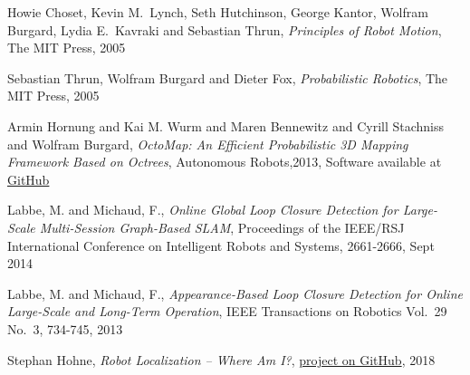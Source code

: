 \documentclass[10pt, journal, compsoc]{IEEEtran}
\begin{document}

\begin{thebibliography}{6}

Howie Choset, Kevin M.\ Lynch, Seth Hutchinson, George Kantor, Wolfram Burgard, Lydia E.\ Kavraki and Sebastian Thrun, \textit{Principles of Robot Motion}, The MIT Press, 2005

Sebastian Thrun, Wolfram Burgard and Dieter Fox, \textit{Probabilistic Robotics}, The MIT Press, 2005

Armin Hornung and Kai M. Wurm and Maren Bennewitz and Cyrill Stachniss and Wolfram Burgard, \textit{OctoMap: An Efficient Probabilistic 3D Mapping Framework Based on Octrees}, Autonomous Robots,2013, Software available at \href{http://octomap.github.com}{GitHub}

Labbe, M. and Michaud, F., \textit{Online Global Loop Closure Detection for Large-Scale Multi-Session Graph-Based SLAM}, Proceedings of the IEEE/RSJ International Conference on Intelligent Robots and Systems, 2661-2666, Sept 2014

Labbe, M. and Michaud, F., \textit{Appearance-Based Loop Closure Detection for Online Large-Scale and Long-Term Operation}, IEEE Transactions on Robotics Vol.\ 29 No.\ 3, 734-745, 2013

Stephan Hohne, \textit{Robot Localization -- Where Am I?}, \href{https://github.com/S2H-Mobile/RoboND-Localization-Project}{project on GitHub}, 2018

\end{thebibliography}
\end{document}
